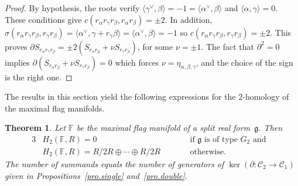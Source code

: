 \documentclass[10pt,a4paper]{amsart}
\numberwithin{equation}{section}
\newtheorem{Theorem}{Theorem}[section]
\begin{document}
\begin{proof}By hypothesis, the roots verify $\langle \gamma ^{\vee },\beta \rangle =-1= \langle \alpha ^{\vee },\beta \rangle $ and $ \langle \alpha,\gamma \rangle =0$. These conditions give $c( r_{\alpha}r_{\gamma }r_{\beta },r_{\alpha }r_{\beta }) =\pm 2$. In addition, $\sigma (r_{\alpha }r_{\gamma }r_{\beta },r_{\gamma }r_{\beta })=\langle\alpha ^{\vee },\gamma +r_{\gamma }\beta \rangle =\langle \alpha^{\vee },\beta \rangle =-1$ so $c(r_{\alpha }r_{\gamma }r_{\beta},r_{\gamma }r_{\beta })=\pm 2$. This proves $\partial S_{r_{\alpha}r_{\gamma }r_{\beta }}=\pm 2(S_{r_{\alpha }r_{\beta }}+\nu S_{r_{\gamma}r_{\beta }})$, for some $\nu =\pm 1$. The fact that $\partial ^{2}=0$ implies $\partial ( S_{r_{\alpha }r_{\beta }}+\nu S_{r_{\gamma }r_{\beta }}) =0$ which forces $\nu =\eta_{\alpha,\beta,\gamma }$, and the choice of the sign is the right one.
\end{proof}

The results in this section yield the following expressions for the $2$-homology of the maximal flag manifolds.

\begin{Theorem}\label{thm.2homfull}Let $\mathbb{F}$ be the maximal flag manifold of a split real form~$\mathfrak{g}$. Then
\begin{alignat*}{3}
& H_{2} ( \mathbb{F},R ) = 0\qquad && \mbox{if }\mathfrak{g} \mbox{ is of type }G_{2}\mbox{ and} & \\
& H_{2} ( \mathbb{F},R ) = R/2R\oplus \cdots \oplus R/2R \qquad && \mbox{otherwise}.&
\end{alignat*}
The number of summands equals the number of generators of $\ker( \partial\colon \mathcal{C}_{2}\longrightarrow \mathcal{C}_{1})$ given in Propositions~{\rm \ref{pro.single}} and~{\rm \ref{pro.double}}.
\end{Theorem}
\end{document}

